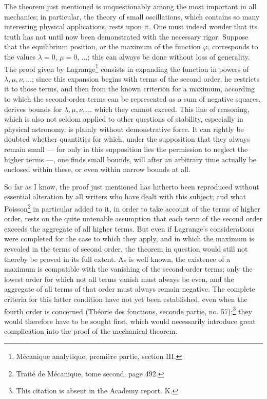\documentclass[11pt]{article}
\begin{document}
The theorem just mentioned is unquestionably among the most important in all mechanics; in particular, the theory of small oscillations, which contains so many interesting physical applications, rests upon it. One must indeed wonder that its truth has not until now been demonstrated with the necessary rigor. Suppose that the equilibrium position, or the maximum of the function $\varphi$, corresponds to the values $\lambda=0$, $\mu=0$, $\ldots$; this can always be done without loss of generality. The proof given by Lagrange\footnote{Mécanique analytique, première partie, section III.} consists in expanding the function in powers of $\lambda,\mu,\nu,\ldots$; since this expansion begins with terms of the second order, he restricts it to those terms, and then from the known criterion for a maximum, according to which the second-order terms can be represented as a sum of negative squares, derives bounds for $\lambda,\mu,\nu,\ldots$ which they cannot exceed. This line of reasoning, which is also not seldom applied to other questions of stability, especially in physical astronomy, is plainly without demonstrative force. It can rightly be doubted whether quantities for which, under the supposition that they always remain small --- for only in this supposition lies the permission to neglect the higher terms ---, one finds small bounds, will after an arbitrary time actually be enclosed within these, or even within narrow bounds at all.

So far as I know, the proof just mentioned has hitherto been reproduced without essential alteration by all writers who have dealt with this subject; and what Poisson\footnote{Traité de Mécanique, tome second, page 492.} in particular added to it, in order to take account of the terms of higher order, rests on the quite untenable assumption that each term of the second order exceeds the aggregate of all higher terms. But even if Lagrange's considerations were completed for the case to which they apply, and in which the maximum is revealed in the terms of second order, the theorem in question would still not thereby be proved in its full extent. As is well known, the existence of a maximum is compatible with the vanishing of the second-order terms; only the lowest order for which not all terms vanish must always be even, and the aggregate of all terms of that order must always remain negative. The complete criteria for this latter condition have not yet been established, even when the fourth order is concerned (Théorie des fonctions, seconde partie, no. 57);\footnote{This citation is absent in the Academy report. K.} they would therefore have to be sought first, which would necessarily introduce great complication into the proof of the mechanical theorem.
\end{document}
